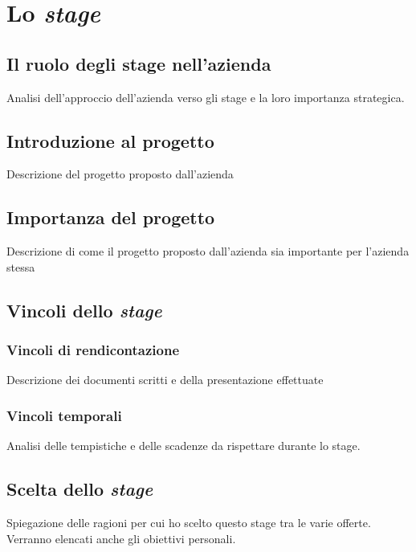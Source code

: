 \chapter{Lo \textit{stage}}
\label{cap:lo-stage}

\section{Il ruolo degli stage nell'azienda}
Analisi dell'approccio dell'azienda verso gli stage e la loro importanza strategica.

\section{Introduzione al progetto}
Descrizione del progetto proposto dall'azienda

\section{Importanza del progetto}
Descrizione di come il progetto proposto dall'azienda sia importante per l'azienda stessa

\section{Vincoli dello \textit{stage}}
\subsection{Vincoli di rendicontazione}
Descrizione dei documenti scritti e della presentazione effettuate
\subsection{Vincoli temporali}
Analisi delle tempistiche e delle scadenze da rispettare durante lo stage.


\section{Scelta dello \textit{stage}}
Spiegazione delle ragioni per cui ho scelto questo stage tra le varie offerte.
Verranno elencati anche gli obiettivi personali.
